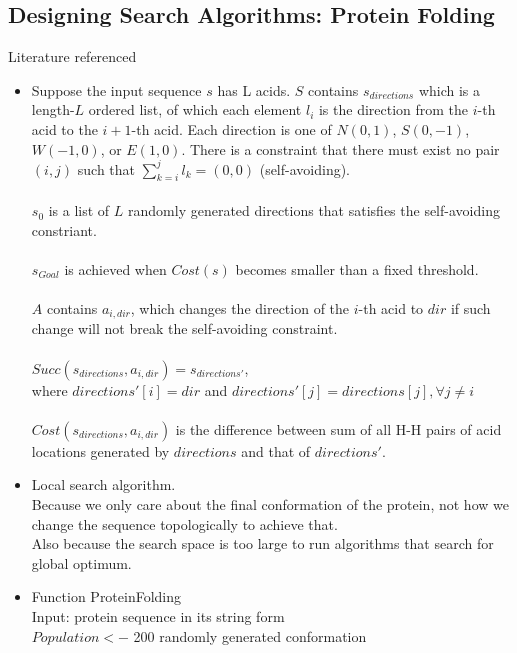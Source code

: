 \documentclass[11pt]{article}
\begin{document}
\begin{onehalfspace}
    \section{Designing Search Algorithms: Protein Folding}
    Literature referenced\cite{protein}
    \begin{itemize}
    \item
    Suppose the input sequence $s$ has L acids.
    $S$ contains $s_{directions}$ which is a length-$L$ ordered list, of which each element $l_i$ is the direction from the $i$-th acid to the $i+1$-th acid. Each direction is one of $N(0,1)$, $S(0,-1)$, $W(-1,0)$, or $E(1,0)$. There is a constraint that there must exist no pair $(i, j)$ such that $\sum_{k=i}^j l_k = (0,0)$ (self-avoiding). \\ \\
    $s_0$ is a list of $L$ randomly generated directions that satisfies the self-avoiding constriant.\\ \\
    $s_{Goal}$ is achieved when $Cost(s)$ becomes smaller than a fixed threshold. \\ \\
    $A$ contains $a_{i, dir}$, which changes the direction of the $i$-th acid to $dir$ if such change will not break the self-avoiding constraint. \\ \\
    $Succ(s_{directions}, a_{i, dir}) = s_{directions'}$, \\where $directions'[i] = dir$ and $directions'[j] = directions[j],\forall j \ne i$ \\ \\
    $Cost(s_{directions}, a_{i, dir})$ is the difference between sum of all H-H pairs of acid locations generated by $directions$ and that of $directions'$.
    \item
    Local search algorithm. \\
    Because we only care about the final conformation of the protein, not how we change the sequence topologically to achieve that. \\
    Also because the search space is too large to run algorithms that search for global optimum. 
    \item
    \newcommand\tab[1][1cm]{\hspace*{#1}}
    Function ProteinFolding \\
    Input: protein sequence in its string form \\
    \tab $Population <- $ 200 randomly generated conformation \\

\end{itemize}
\end{onehalfspace}
\end{document}
